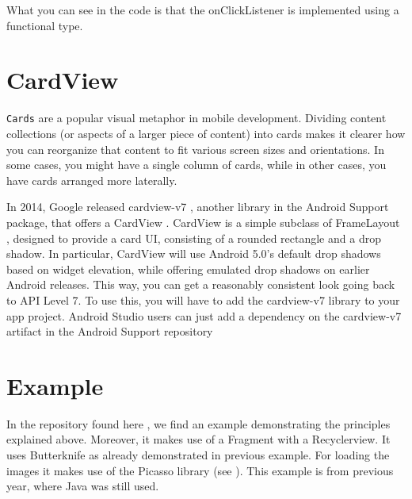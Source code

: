 What you can see in the code is that the onClickListener is implemented using a functional type. 



\section{CardView}
\lstinline!Cards! are a popular visual metaphor in mobile development. Dividing content collections (or aspects of a larger piece of content) into cards makes it clearer how you can reorganize that content to fit various screen sizes and orientations. In some cases, you might have a single column of cards, while in other cases, you have cards
arranged more laterally.

In 2014, Google released cardview-v7 , another library in the Android Support
package, that offers a CardView . CardView is a simple subclass of FrameLayout ,
designed to provide a card UI, consisting of a rounded rectangle and a drop shadow.
In particular, CardView will use Android 5.0’s default drop shadows based on widget
elevation, while offering emulated drop shadows on earlier Android releases. This
way, you can get a reasonably consistent look going back to API Level 7.
To use this, you will have to add the cardview-v7 library to your app project.
Android Studio users can just add a dependency on the cardview-v7 artifact in the
Android Support repository

\section{Example}

\begin{example}
	In the repository found here \cite{Buysse2017}, we find an example demonstrating the principles explained above. Moreover, it makes use of a Fragment with a Recyclerview. It uses Butterknife as already demonstrated in previous example. For loading the images it makes use of the Picasso library (see \cite{Square2017}). This example is from previous year, where Java was still used. 
\end{example}



